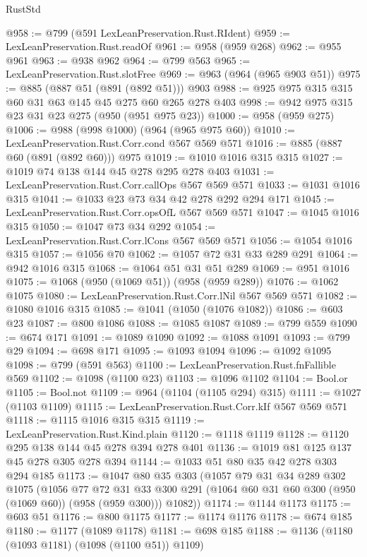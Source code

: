 \begin{lexlean}{RustStd}
\begin{coremodule}
{\begin{coremodule}
{{{{{{{{{@958 := @799 (@591 LexLeanPreservation.Rust.RIdent)
@959 := LexLeanPreservation.Rust.readOf
@961 := @958 (@959 @268)
@962 := @955 @961
@963 := @938 @962
@964 := @799 @563
@965 := LexLeanPreservation.Rust.slotFree
@969 := @963 (@964 (@965 @903 @51))
@975 := @885 (@887 @51 (@891 (@892 @51))) @903
@988 := @925 @975 @315 @315 @60 @31 @63 @145 @45 @275 @60 @265 @278 @403
@998 := @942 @975 @315 @23 @31 @23 @275 (@950 (@951 @975 @23))
@1000 := @958 (@959 @275)
@1006 := @988 (@998 @1000) (@964 (@965 @975 @60))
@1010 := LexLeanPreservation.Rust.Corr.cond @567 @569 @571
@1016 := @885 (@887 @60 (@891 (@892 @60))) @975
@1019 := @1010 @1016 @315 @315
@1027 := @1019 @74 @138 @144 @45 @278 @295 @278 @403
@1031 := LexLeanPreservation.Rust.Corr.callOps @567 @569 @571
@1033 := @1031 @1016 @315
@1041 := @1033 @23 @73 @34 @42 @278 @292 @294 @171
@1045 := LexLeanPreservation.Rust.Corr.opsOfL @567 @569 @571
@1047 := @1045 @1016 @315
@1050 := @1047 @73 @34 @292
@1054 := LexLeanPreservation.Rust.Corr.lCons @567 @569 @571
@1056 := @1054 @1016 @315
@1057 := @1056 @70
@1062 := @1057 @72 @31 @33 @289 @291
@1064 := @942 @1016 @315
@1068 := @1064 @51 @31 @51 @289
@1069 := @951 @1016
@1075 := @1068 (@950 (@1069 @51)) (@958 (@959 @289))
@1076 := @1062 @1075
@1080 := LexLeanPreservation.Rust.Corr.lNil @567 @569 @571
@1082 := @1080 @1016 @315
@1085 := @1041 (@1050 (@1076 @1082))
@1086 := @603 @23
@1087 := @800 @1086
@1088 := @1085 @1087
@1089 := @799 @559
@1090 := @674 @171
@1091 := @1089 @1090
@1092 := @1088 @1091
@1093 := @799 @29
@1094 := @698 @171
@1095 := @1093 @1094
@1096 := @1092 @1095
@1098 := @799 (@591 @563)
@1100 := LexLeanPreservation.Rust.fnFallible @569
@1102 := @1098 (@1100 @23)
@1103 := @1096 @1102
@1104 := Bool.or
@1105 := Bool.not
@1109 := @964 (@1104 (@1105 @294) @315)
@1111 := @1027 (@1103 @1109)
@1115 := LexLeanPreservation.Rust.Corr.kIf @567 @569 @571
@1118 := @1115 @1016 @315 @315
@1119 := LexLeanPreservation.Rust.Kind.plain
@1120 := @1118 @1119
@1128 := @1120 @295 @138 @144 @45 @278 @394 @278 @401
@1136 := @1019 @81 @125 @137 @45 @278 @305 @278 @394
@1144 := @1033 @51 @80 @35 @42 @278 @303 @294 @185
@1173 := @1047
    @80
    @35
    @303
    (@1057
      @79
      @31
      @34
      @289
      @302
      @1075
      (@1056
        @77
        @72
        @31
        @33
        @300
        @291
        (@1064 @60 @31 @60 @300 (@950 (@1069 @60)) (@958 (@959 @300)))
        @1082))
@1174 := @1144 @1173
@1175 := @603 @51
@1176 := @800 @1175
@1177 := @1174 @1176
@1178 := @674 @185
@1180 := @1177 (@1089 @1178)
@1181 := @698 @185
@1188 := @1136 (@1180 (@1093 @1181) (@1098 (@1100 @51)) @1109)
}}}}}}}}}
\end{coremodule}}
\end{coremodule}
\end{lexlean}
